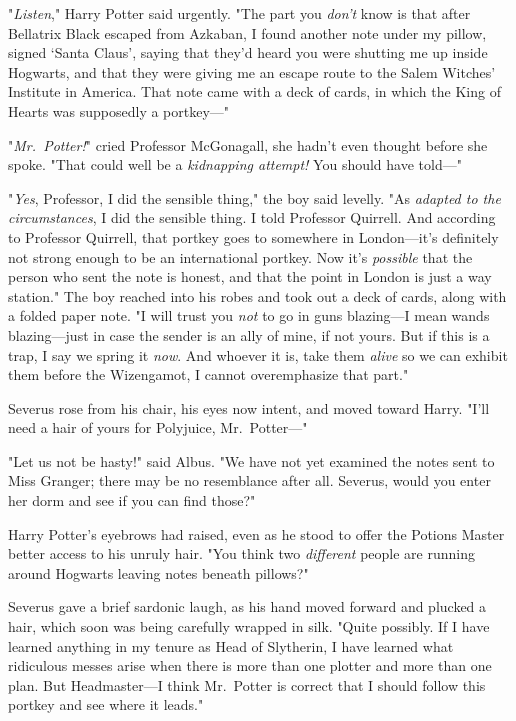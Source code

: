 "\emph{Listen}," Harry Potter said urgently. "The part you \emph{don't} know is
that after Bellatrix Black escaped from Azkaban, I found another note under my
pillow, signed `Santa Claus', saying that they'd heard you were shutting me up
inside Hogwarts, and that they were giving me an escape route to the Salem
Witches' Institute in America. That note came with a deck of cards, in which
the King of Hearts was supposedly a portkey---"

"\emph{Mr.~Potter!}" cried Professor McGonagall, she hadn't even thought before
she spoke. "That could well be a \emph{kidnapping attempt!} You should have
told---"

"\emph{Yes}, Professor, I did the sensible thing," the boy said levelly. "As
\emph{adapted to the circumstances}, I did the sensible thing. I told Professor
Quirrell. And according to Professor Quirrell, that portkey goes to somewhere
in London---it's definitely not strong enough to be an international portkey.
Now it's \emph{possible} that the person who sent the note is honest, and that
the point in London is just a way station." The boy reached into his robes and
took out a deck of cards, along with a folded paper note. "I will trust you
\emph{not} to go in guns blazing---I mean wands blazing---just in case the
sender is an ally of mine, if not yours. But if this is a trap, I say we spring
it \emph{now}. And whoever it is, take them \emph{alive} so we can exhibit them
before the Wizengamot, I cannot overemphasize that part."

Severus rose from his chair, his eyes now intent, and moved toward Harry. "I'll
need a hair of yours for Polyjuice, Mr.~Potter---"

"Let us not be hasty!" said Albus. "We have not yet examined the notes sent to
Miss Granger; there may be no resemblance after all. Severus, would you enter
her dorm and see if you can find those?"

Harry Potter's eyebrows had raised, even as he stood to offer the Potions
Master better access to his unruly hair. "You think two \emph{different}
people are running around Hogwarts leaving notes beneath pillows?"

Severus gave a brief sardonic laugh, as his hand moved forward and plucked a
hair, which soon was being carefully wrapped in silk. "Quite possibly. If I
have learned anything in my tenure as Head of Slytherin, I have learned what
ridiculous messes arise when there is more than one plotter and more than one
plan. But Headmaster---I think Mr.~Potter is correct that I should follow this
portkey and see where it leads."

